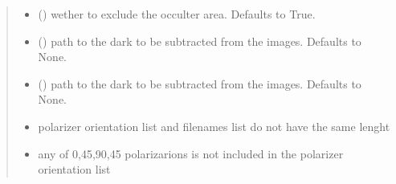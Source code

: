 \documentclass[letterpaper,10pt,english]{sphinxmanual}
\begin{document}
\begin{fulllineitems}
\begin{quote}
\begin{description}
\begin{itemize}
\item {} 
\sphinxAtStartPar
{} (\sphinxstyleliteralemphasis{\sphinxupquote{, }}) \textendash{} wether to exclude the occulter area. Defaults to True.

\item {} 
\sphinxAtStartPar
{} (\sphinxstyleliteralemphasis{\sphinxupquote{, }}) \textendash{} path to the dark to be subtracted from the images. Defaults to None.

\item {} 
\sphinxAtStartPar
{} (\sphinxstyleliteralemphasis{\sphinxupquote{, }}) \textendash{} path to the dark to be subtracted from the images. Defaults to None.

\end{itemize}

\begin{itemize}
\item {} 
\sphinxAtStartPar
{} \textendash{} polarizer orientation list and filenames list do not have the same lenght

\item {} 
\sphinxAtStartPar
{} \textendash{} any of 0,45,90,\sphinxhyphen{}45 polarizarions is not included in the polarizer orientation list

\end{itemize}

\end{description}\end{quote}

\end{fulllineitems}

\end{document}
